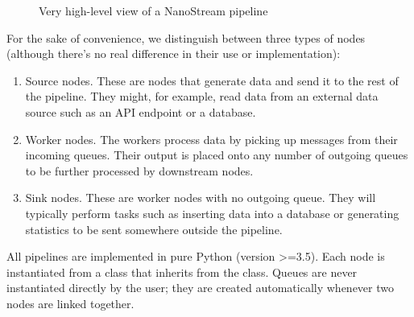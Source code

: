 \documentclass[letterpaper,10pt,english]{sphinxmanual}
\let\sphinxpxdimen\pdfpxdimen\else\newdimen\sphinxpxdimen
\begin{document}
\begin{figure}[htbp]
\centering
\capstart

\noindent\sphinxincludegraphics[width=600\sphinxpxdimen]{{30k_view}.png}
\caption{Very high-level view of a NanoStream pipeline}\label{\detokenize{overview:id1}}\end{figure}

For the sake of convenience, we distinguish between three types of nodes
(although there’s no real difference in their use or implementation):
\begin{enumerate}
\def\theenumi{\arabic{enumi}}
\def\labelenumi{\theenumi .}
\makeatletter\def\p@enumii{\p@enumi \theenumi .}\makeatother
\item {} 
Source nodes. These are nodes that generate data and send it to the rest
of the pipeline. They might, for example, read data from an external
data source such as an API endpoint or a database.

\item {} 
Worker nodes. The workers process data by picking up messages from their
incoming queues. Their output is placed onto any number of outgoing queues
to be further processed by downstream nodes.

\item {} 
Sink nodes. These are worker nodes with no outgoing queue. They will
typically perform tasks such as inserting data into a database or generating
statistics to be sent somewhere outside the pipeline.

\end{enumerate}

All pipelines are implemented in pure Python (version \textgreater{}=3.5). Each node is
instantiated from a class that inherits from the  class. Queues
are never instantiated directly by the user; they are created automatically
whenever two nodes are linked together.
\end{document}
